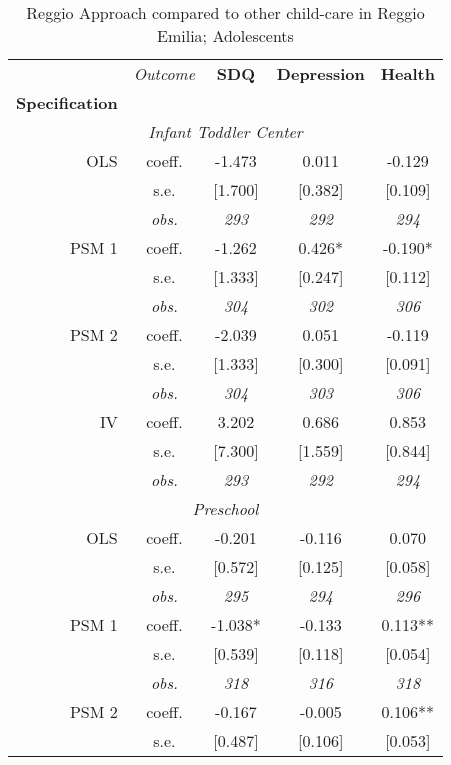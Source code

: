\begin{table}[H]
\caption{Reggio Approach compared to other child-care in Reggio Emilia; Adolescents}
\label{tab:resultsAdo-reggio}
 \begin{centering} 
\vspace{1ex}
\begin{tabular}{ r c ccc} 
\hline \hline 
 & \textit{Outcome} & \textbf{SDQ}  & \textbf{Depression} & \textbf{Health}  \\ 
\textbf{Specification}  &  &  &  &  \\ 
\hline 
\multicolumn{5}{c}{\textit{Infant Toddler Center }} \\ 
\hline 

OLS	 & coeff.	 & -1.473	 & 0.011	 & -0.129	\\
	 & s.e.	 & [1.700]	 & [0.382]	 & [0.109]	\\
	 & \textit{obs.}	 & \textit{293}	 & \textit{292}	 & \textit{294}	\\
PSM 1	 & coeff.	 & -1.262	 & 0.426*	 & -0.190*	\\
	 & s.e.	 & [1.333]	 & [0.247]	 & [0.112]	\\
	 & \textit{obs.}	 & \textit{304}	 & \textit{302}	 & \textit{306}	\\
PSM 2	 & coeff.	 & -2.039	 & 0.051	 & -0.119	\\
	 & s.e.	 & [1.333]	 & [0.300]	 & [0.091]	\\
	 & \textit{obs.}	 & \textit{304}	 & \textit{303}	 & \textit{306}	\\
IV	 & coeff.	 & 3.202	 & 0.686	 & 0.853	\\
	 & s.e.	 & [7.300]	 & [1.559]	 & [0.844]	\\
	 & \textit{obs.}	 & \textit{293}	 & \textit{292}	 & \textit{294}	\\
\hline \multicolumn{5}{c}{\textit{Preschool }} \\ \hline
OLS	 & coeff.	 & -0.201	 & -0.116	 & 0.070	\\
	 & s.e.	 & [0.572]	 & [0.125]	 & [0.058]	\\
	 & \textit{obs.}	 & \textit{295}	 & \textit{294}	 & \textit{296}	\\
PSM 1	 & coeff.	 & -1.038*	 & -0.133	 & 0.113**	\\
	 & s.e.	 & [0.539]	 & [0.118]	 & [0.054]	\\
	 & \textit{obs.}	 & \textit{318}	 & \textit{316}	 & \textit{318}	\\
PSM 2	 & coeff.	 & -0.167	 & -0.005	 & 0.106**	\\
	 & s.e.	 & [0.487]	 & [0.106]	 & [0.053]	\\

\end{tabular}
\end{centering}
\end{table}
